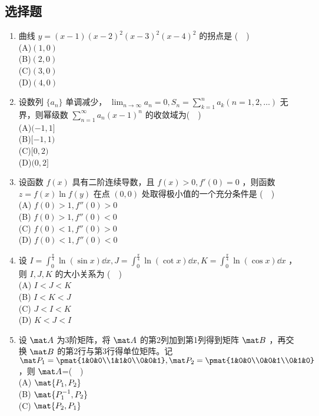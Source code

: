 \subsection{选择题}
\begin{enumerate}
\item 曲线 $y=(x-1)(x-2)^2(x-3)^2(x-4)^2$ 的拐点是  ($\quad$)\\
(A)$(1,0)$\\
(B)$(2,0)$\\
(C)$(3,0)$\\
(D)$(4,0)$
\item 设数列 $\{a_n\}$ 单调减少， $\displaystyle \lim_{n\to\infty} a_n=0,S_n=\sum_{k=1}^{n}a_k(n=1,2,\dots)$  无界，则幂级数 $\displaystyle \sum_{n=1}^\infty a_n(x-1)^n$ 的收敛域为($\quad$)\\
(A)$(-1,1]$\\
(B)$[-1,1)$\\
(C)$[0,2)$\\
(D)$(0,2]$
\item  设函数 $f(x)$ 具有二阶连续导数，且 $f(x)>0,f'(0)=0$  ，则函数  $z=f(x)\ln f(y)$ 在点 $(0,0)$ 处取得极小值的一个充分条件是 ($\quad$)\\
(A) $f(0)>1,f''(0)>0$\\
(B) $f(0)>1,f''(0)<0$\\
(C) $f(0)<1,f''(0)>0$\\
(D) $f(0)<1,f''(0)<0$
\item 设 $\displaystyle I=\int_{0}^{\frac{\pi}{4}}\ln (\sin x)\dd{x},J=\int_{0}^{\frac{\pi}{4}}\ln (\cot x)\dd{x},K=\int_{0}^{\frac{\pi}{4}}\ln (\cos x)\dd{x}$ ，则 $I,J,K$ 的大小关系为 ($\quad$)\\
(A) $I<J<K$\\
(B) $I<K<J$\\
(C) $J<I<K$\\
(D) $K<J<I$
\item 设 $\mat A$ 为3阶矩阵，将 $\mat A$ 的第2列加到第1列得到矩阵 $\mat B$ ，再交换 $\mat B$ 的第2行与第3行得单位矩阵。记 $\mat P_1=\pmat{1&0&0\\1&1&0\\0&0&1},\mat P_2=\pmat{1&0&0\\0&0&1\\0&1&0}$ ，则 $\mat A$=($\quad$)\\
(A) $\mat {P_1,P_2}$\\
(B) $\mat {P_1^{-1},P_2}$\\
(C) $\mat {P_2,P_1}$\\

\end{enumerate}
